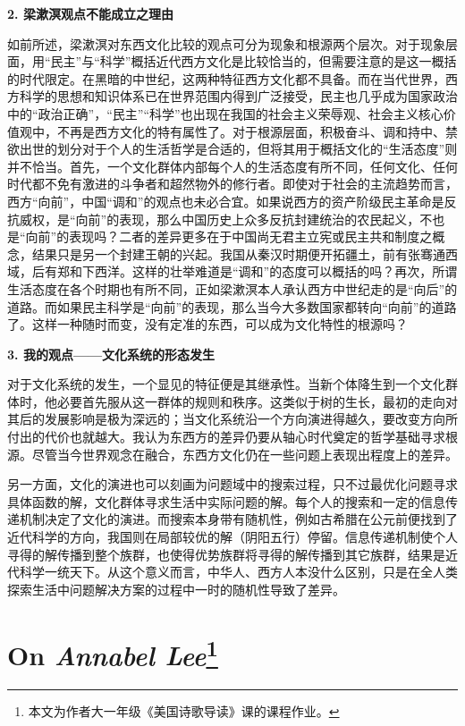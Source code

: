 \par \textbf{2. 梁漱溟观点不能成立之理由}
\par 如前所述，梁漱溟对东西文化比较的观点可分为现象和根源两个层次。对于现象层面，用“民主”与“科学”概括近代西方文化是比较恰当的，但需要注意的是这一概括的时代限定。在黑暗的中世纪，这两种特征西方文化都不具备。而在当代世界，西方科学的思想和知识体系已在世界范围内得到广泛接受，民主也几乎成为国家政治中的“政治正确”，“民主”“科学”也出现在我国的社会主义荣辱观、社会主义核心价值观中，不再是西方文化的特有属性了。对于根源层面，积极奋斗、调和持中、禁欲出世的划分对于个人的生活哲学是合适的，但将其用于概括文化的“生活态度”则并不恰当。首先，一个文化群体内部每个人的生活态度有所不同，任何文化、任何时代都不免有激进的斗争者和超然物外的修行者。即使对于社会的主流趋势而言，西方“向前”，中国“调和”的观点也未必合宜。如果说西方的资产阶级民主革命是反抗威权，是“向前”的表现，那么中国历史上众多反抗封建统治的农民起义，不也是“向前”的表现吗？二者的差异更多在于中国尚无君主立宪或民主共和制度之概念，结果只是另一个封建王朝的兴起。我国从秦汉时期便开拓疆土，前有张骞通西域，后有郑和下西洋。这样的壮举难道是“调和”的态度可以概括的吗？再次，所谓生活态度在各个时期也有所不同，正如梁漱溟本人承认西方中世纪走的是“向后”的道路。而如果民主科学是“向前”的表现，那么当今大多数国家都转向“向前”的道路了。这样一种随时而变，没有定准的东西，可以成为文化特性的根源吗？
\par \textbf{3. 我的观点——文化系统的形态发生}
\par 对于文化系统的发生，一个显见的特征便是其继承性。当新个体降生到一个文化群体时，他必要首先服从这一群体的规则和秩序。这类似于树的生长，最初的走向对其后的发展影响是极为深远的；当文化系统沿一个方向演进得越久，要改变方向所付出的代价也就越大。我认为东西方的差异仍要从轴心时代奠定的哲学基础寻求根源。尽管当今世界观念在融合，东西方文化仍在一些问题上表现出程度上的差异。
\par 另一方面，文化的演进也可以刻画为问题域中的搜索过程，只不过最优化问题寻求具体函数的解，文化群体寻求生活中实际问题的解。每个人的搜索和一定的信息传递机制决定了文化的演进。而搜索本身带有随机性，例如古希腊在公元前便找到了近代科学的方向，我国则在局部较优的解（阴阳五行）停留。信息传递机制使个人寻得的解传播到整个族群，也使得优势族群将寻得的解传播到其它族群，结果是近代科学一统天下。从这个意义而言，中华人、西方人本没什么区别，只是在全人类探索生活中问题解决方案的过程中一时的随机性导致了差异。

\par {}


\setlength{\parindent}{0em}
\section*{On \emph{Annabel Lee}\footnote{本文为作者大一年级《美国诗歌导读》课的课程作业。}}

